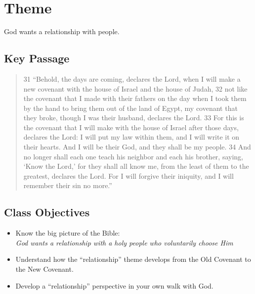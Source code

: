 \chapter{Theme}
\begin{center}
\Large God wants a relationship with people.
\end{center}

\section*{Key Passage}\label{sec:KeyPassage}

\begin{quote}
31 ``Behold, the days are coming, declares the Lord, when I will make a new covenant with the house of Israel and the house of Judah, 32 not like the covenant that I made with their fathers on the day when I took them by the hand to bring them out of the land of Egypt, my covenant that they broke, though I was their husband, declares the Lord. 33 For this is the covenant that I will make with the house of Israel after those days, declares the Lord: I will put my law within them, and I will write it on their hearts. And I will be their God, and they shall be my people. 34 And no longer shall each one teach his neighbor and each his brother, saying, `Know the Lord,' for they shall all know me, from the least of them to the greatest, declares the Lord. For I will forgive their iniquity, and I will remember their sin no more.'' 
\end{quote}

\section*{Class Objectives}\label{sec:ClassObjectives}
\begin{itemize}
\item Know the big picture of the Bible:\\\emph{God wants a relationship with a holy people who voluntarily choose Him}
\item Understand how the ``relationship'' theme develops from the Old Covenant to the New Covenant.
\item Develop a ``relationship'' perspective in your own walk with God.
\end{itemize}
